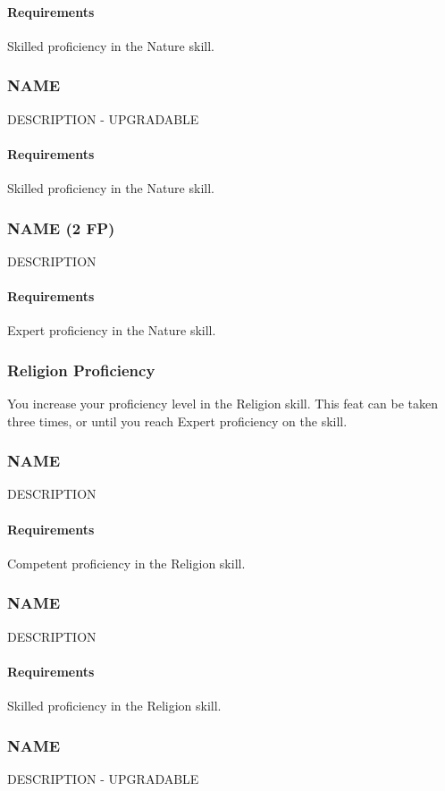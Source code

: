     \paragraph{Requirements} Skilled proficiency in the Nature skill.
\subsubsection{NAME} \label{feat::name}
    DESCRIPTION - UPGRADABLE
    \paragraph{Requirements} Skilled proficiency in the Nature skill.
\subsubsection{NAME (2 FP)} \label{feat::name}
    DESCRIPTION
    \paragraph{Requirements} Expert proficiency in the Nature skill.
\subsubsection{Religion Proficiency} \label{feat::religionprof}
    You increase your proficiency level in the Religion skill.
    This feat can be taken three times, or until you reach Expert proficiency on the skill.
\subsubsection{NAME} \label{feat::name}
    DESCRIPTION
    \paragraph{Requirements} Competent proficiency in the Religion skill.
\subsubsection{NAME} \label{feat::name}
    DESCRIPTION
    \paragraph{Requirements} Skilled proficiency in the Religion skill.
\subsubsection{NAME} \label{feat::name}
    DESCRIPTION - UPGRADABLE

